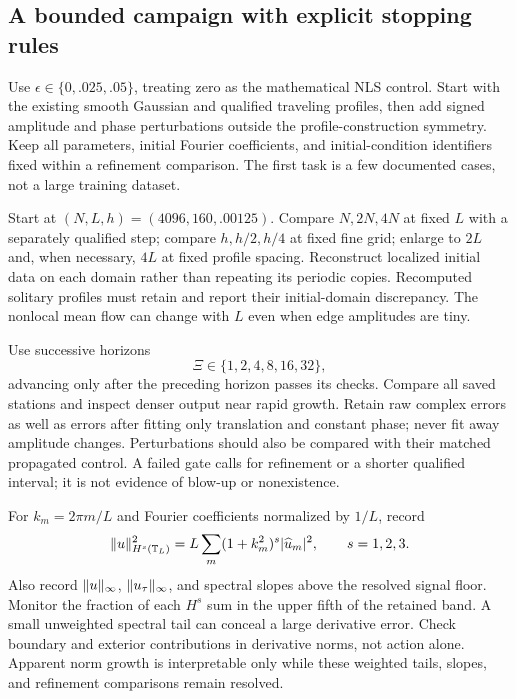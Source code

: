 \subsection{A bounded campaign with explicit stopping rules}

Use $\epsilon\in\{0,.025,.05\}$, treating zero as the mathematical NLS
control.  Start with the existing smooth Gaussian and qualified traveling
profiles, then add signed amplitude and phase perturbations outside the
profile-construction symmetry.  Keep all parameters, initial Fourier
coefficients, and initial-condition identifiers fixed within a refinement
comparison.  The first task is a few documented cases, not a large training
dataset.

Start at $(N,L,h)=(4096,160,.00125)$.  Compare $N,2N,4N$ at fixed $L$ with a
separately qualified step; compare $h,h/2,h/4$ at fixed fine grid; enlarge to
$2L$ and, when necessary, $4L$ at fixed profile spacing.  Reconstruct localized
initial data on each domain rather than repeating its periodic copies.
Recomputed solitary profiles must retain and report their initial-domain
discrepancy.  The nonlocal mean flow can change with $L$ even when edge
amplitudes are tiny.

Use successive horizons
\[
  \Xi\in\{1,2,4,8,16,32\},
\]
advancing only after the preceding horizon passes its checks.  Compare all
saved stations and inspect denser output near rapid growth.  Retain raw
complex errors as well as errors after fitting only translation and constant
phase; never fit away amplitude changes.  Perturbations should also be
compared with their matched propagated control.  A failed gate calls for
refinement or a shorter qualified interval; it is not evidence of blow-up
or nonexistence.

For $k_m=2\pi m/L$ and Fourier coefficients normalized by $1/L$, record
\begin{equation}\label{eq:monitor-sobolev}
 \lVert u\rVert_{H^s(\mathbb T_L)}^2
 =L\sum_m(1+k_m^2)^s|\widehat u_m|^2,
 \qquad s=1,2,3.
\end{equation}
Also record $\lVert u\rVert_{\infty}$, $\lVert u_\tau\rVert_{\infty}$, and spectral
slopes above the resolved signal floor.  Monitor the fraction of each
$H^s$ sum in the upper fifth of the retained band.  A small unweighted
spectral tail can conceal a large derivative error.  Check boundary and
exterior contributions in derivative norms, not action alone.  Apparent
norm growth is interpretable only while these weighted tails, slopes, and
refinement comparisons remain resolved.

